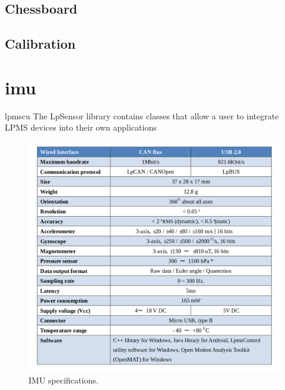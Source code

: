 \subsection{Chessboard}
\label{appendix:cha2:chessboard}

\subsection{Calibration}

\section{\acrlong{imu}}
\label{appendix:cha2:imu}
\acrfull{lpmscu} 
The LpSensor library contains classes that allow a user to integrate LPMS devices into their own applications
\begin{figure}[ht]
	\centering
	\includegraphics[width=\textwidth]{images/imuspecs.png}
	\caption[IMU specifications]{IMU specifications.}
	\label{appendix:cha2:eyescheme}
\end{figure}
